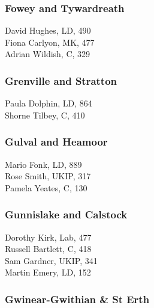 \documentclass[a4paper,openany,10pt]{book}
\begin{document}
\subsubsection*{Fowey and Tywardreath}



David Hughes, LD, 490\\
Fiona Carlyon, MK, 477\\
Adrian Wildish, C, 329\\


\subsubsection*{Grenville and Stratton}



Paula Dolphin, LD, 864\\
Shorne Tilbey, C, 410\\


\subsubsection*{Gulval and Heamoor}



Mario Fonk, LD, 889\\
Rose Smith, UKIP, 317\\
Pamela Yeates, C, 130\\


\subsubsection*{Gunnislake and Calstock}



Dorothy Kirk, Lab, 477\\
Russell Bartlett, C, 418\\
Sam Gardner, UKIP, 341\\
Martin Emery, LD, 152\\


\subsubsection*{Gwinear-Gwithian \& St Erth}
\end{document}
